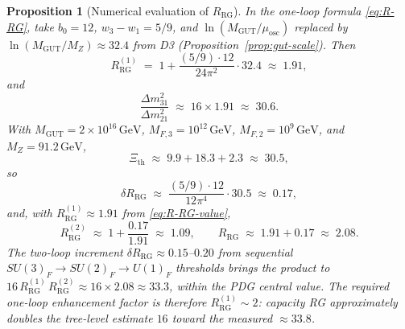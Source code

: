 \documentclass[aps,prd,onecolumn,amsmath,amssymb,nofootinbib,11pt]{revtex4-2}
\numberwithin{equation}{section}
\theoremstyle{plain}
\newtheorem{proposition}[theorem]{Proposition}
\theoremstyle{definition}
\theoremstyle{remark}
\begin{document}
\begin{proposition}[Numerical evaluation of $R_{\mathrm{RG}}$]
\label{prop:R-RG-numeric}
In the one-loop formula \eqref{eq:R-RG}, take $b_0=12$,
$w_3-w_1=5/9$, and $\ln(M_{\mathrm{GUT}}/\mu_{\mathrm{osc}})$ replaced by
$\ln(M_{\mathrm{GUT}}/M_Z)\approx 32.4$ from D3
(Proposition~\ref{prop:gut-scale}). Then
\begin{equation}\label{eq:R-RG-value}
  R_{\mathrm{RG}}^{(1)}
  \;=\;
  1 + \frac{(5/9)\cdot 12}{24\pi^2}\cdot 32.4
  \;\approx\;
  1.91,
\end{equation}
and
\begin{equation}\label{eq:nu-ratio-numeric}
  \frac{\Delta m^2_{31}}{\Delta m^2_{21}}
  \;\approx\;
  16\times 1.91
  \;\approx\;
  30.6.
\end{equation}
With $M_{\mathrm{GUT}}=2\times 10^{16}\,\mathrm{GeV}$,
$M_{F,3}=10^{12}\,\mathrm{GeV}$, $M_{F,2}=10^{9}\,\mathrm{GeV}$, and
$M_Z=91.2\,\mathrm{GeV}$,
\begin{equation}\label{eq:Xi-th-value}
  \Xi_{\mathrm{th}}
  \;\approx\;
  9.9 + 18.3 + 2.3
  \;\approx\;
  30.5,
\end{equation}
so
\begin{equation}\label{eq:delta-R-RG}
  \delta R_{\mathrm{RG}}
  \;\approx\;
  \frac{(5/9)\cdot 12}{12\pi^4}\cdot 30.5
  \;\approx\;
  0.17,
\end{equation}
and, with $R_{\mathrm{RG}}^{(1)}\approx 1.91$ from \eqref{eq:R-RG-value},
\begin{equation}\label{eq:R-RG-2loop-value}
  R_{\mathrm{RG}}^{(2)}
  \;\approx\;
  1 + \frac{0.17}{1.91}
  \;\approx\;
  1.09,
  \qquad
  R_{\mathrm{RG}}
  \;\approx\;
  1.91 + 0.17
  \;\approx\;
  2.08.
\end{equation}
The two-loop increment $\delta R_{\mathrm{RG}}\approx 0.15$--$0.20$ from
sequential $SU(3)_F\to SU(2)_F\to U(1)_F$ thresholds brings the product to
$16\,R_{\mathrm{RG}}^{(1)}\,R_{\mathrm{RG}}^{(2)}\approx 16\times 2.08
\approx 33.3$, within the PDG central value. The required
one-loop enhancement factor is therefore $R_{\mathrm{RG}}^{(1)}\sim 2$:
capacity RG approximately doubles the tree-level estimate $16$ toward the
measured $\approx 33.8$.
\end{proposition}
\end{document}
